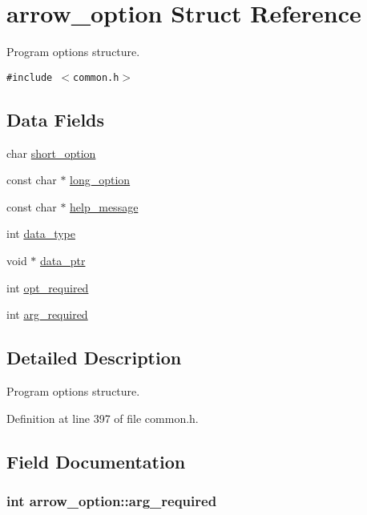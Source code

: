 \hypertarget{structarrow__option}{
\section{arrow\_\-option Struct Reference}
\label{structarrow__option}
}
Program options structure.  


{\tt \#include $<$common.h$>$}

\subsection*{Data Fields}
\begin{CompactItemize}
\item 
char \hyperlink{structarrow__option_f47f3010fcddb84f4a67920db03d7233}{short\_\-option}
\item 
const char $\ast$ \hyperlink{structarrow__option_3d8ddc7b0d627a15c7108e21a16cb51a}{long\_\-option}
\item 
const char $\ast$ \hyperlink{structarrow__option_48bfe5bda71cd04d92067b203ffb92ce}{help\_\-message}
\item 
int \hyperlink{structarrow__option_c97df040be0b7c76e92556087be21ff8}{data\_\-type}
\item 
void $\ast$ \hyperlink{structarrow__option_0b4e8cc50fdb7d8fbb1e63db30cd172d}{data\_\-ptr}
\item 
int \hyperlink{structarrow__option_2e7290d4b7088eab30df5f3bfc34ce93}{opt\_\-required}
\item 
int \hyperlink{structarrow__option_59aa495c8bd2e4d57014e4d9278020ed}{arg\_\-required}
\end{CompactItemize}


\subsection{Detailed Description}
Program options structure. 

Definition at line 397 of file common.h.

\subsection{Field Documentation}
\hypertarget{structarrow__option_59aa495c8bd2e4d57014e4d9278020ed}{
\subsubsection[{arg\_\-required}]{\setlength{\rightskip}{0pt plus 5cm}int {\bf arrow\_\-option::arg\_\-required}}}
\label{structarrow__option_59aa495c8bd2e4d57014e4d9278020ed}


